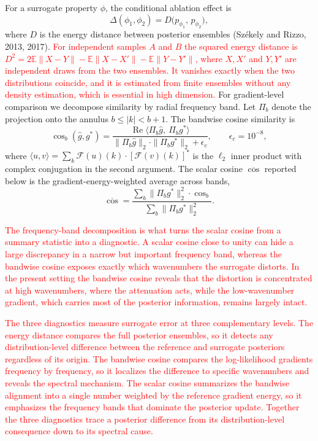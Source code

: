 \documentclass[12pt]{article}
\newcommand{\add}[1]{\textcolor{red}{#1}}
\begin{document}
For a surrogate property $\phi$, the conditional ablation effect is
\begin{equation}
\Delta(\phi_{1},\phi_{2})=D\big(p_{\phi_{1}},\,p_{\phi_{2}}\big),
\end{equation}
where $D$ is the energy distance between posterior ensembles (Sz\'ekely and Rizzo, 2013, 2017). \add{For independent samples $A$ and $B$ the squared energy distance is $D^{2}=2\mathbb{E}\|X-Y\|-\mathbb{E}\|X-X'\|-\mathbb{E}\|Y-Y'\|$, where $X,X'$ and $Y,Y'$ are independent draws from the two ensembles. It vanishes exactly when the two distributions coincide, and it is estimated from finite ensembles without any density estimation, which is essential in high dimension.} For gradient-level comparison we decompose similarity by radial frequency band. Let $\Pi_{b}$ denote the projection onto the annulus $b\le|k|<b+1$. The bandwise cosine similarity is
\begin{equation}
\cos_{b}(\hat g,g^{*})=\frac{\operatorname{Re}\langle\Pi_{b}\hat g,\ \Pi_{b}g^{*}\rangle}{\|\Pi_{b}\hat g\|_{2}\cdot\|\Pi_{b}g^{*}\|_{2}+\epsilon_{c}},\qquad \epsilon_{c}=10^{-8},
\end{equation}
where $\langle u,v\rangle=\sum_{k}\mathcal{F}(u)(k)\cdot[\mathcal{F}(v)(k)]^{*}$ is the $\ell_{2}$ inner product with complex conjugation in the second argument. The scalar cosine $\overline{\cos}$ reported below is the gradient-energy-weighted average across bands,
\begin{equation}
\overline{\cos}=\frac{\sum_{b}\|\Pi_{b}g^{*}\|_{2}^{2}\cdot\cos_{b}}{\sum_{b}\|\Pi_{b}g^{*}\|_{2}^{2}}.
\end{equation}

\add{The frequency-band decomposition is what turns the scalar cosine from a summary statistic into a diagnostic. A scalar cosine close to unity can hide a large discrepancy in a narrow but important frequency band, whereas the bandwise cosine exposes exactly which wavenumbers the surrogate distorts. In the present setting the bandwise cosine reveals that the distortion is concentrated at high wavenumbers, where the attenuation acts, while the low-wavenumber gradient, which carries most of the posterior information, remains largely intact.}

\add{The three diagnostics measure surrogate error at three complementary levels. The energy distance compares the full posterior ensembles, so it detects any distribution-level difference between the reference and surrogate posteriors regardless of its origin. The bandwise cosine compares the log-likelihood gradients frequency by frequency, so it localizes the difference to specific wavenumbers and reveals the spectral mechanism. The scalar cosine summarizes the bandwise alignment into a single number weighted by the reference gradient energy, so it emphasizes the frequency bands that dominate the posterior update. Together the three diagnostics trace a posterior difference from its distribution-level consequence down to its spectral cause.}
\end{document}
